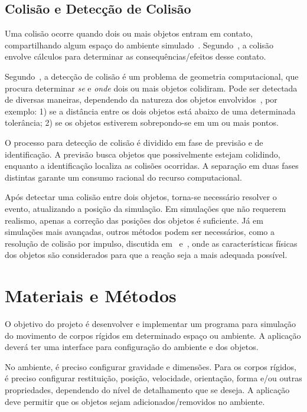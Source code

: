 \documentclass[12pt]{article}
\begin{document}
\subsection{Colisão e Detecção de Colisão}

Uma colisão ocorre quando dois ou mais objetos entram em contato, compartilhando algum espaço do ambiente simulado~\cite{ericson2004real}. Segundo~\cite{bourg2013physics}, a colisão envolve cálculos para determinar as consequências/efeitos desse contato.

Segundo~\cite{bourg2013physics}, a detecção de colisão é um problema de geometria computacional, que procura determinar \emph{se} e \emph{onde} dois ou mais objetos colidiram. Pode ser detectada de diversas maneiras, dependendo da natureza dos objetos envolvidos~\cite{foley1996}, por exemplo: 1) se a distância entre os dois objetos está abaixo de uma determinada tolerância; 2) se os objetos estiverem sobrepondo-se em um ou mais pontos.

O processo para detecção de colisão é dividido em fase de previsão e de identificação. A previsão busca objetos que possivelmente estejam colidindo, enquanto a identificação localiza as colisões ocorridas. A separação em duas fases distintas garante um consumo racional do recurso computacional. 

Após detectar uma colisão entre dois objetos, torna-se necessário resolver o evento, atualizando a posição da simulação. Em simulações que não requerem realismo, apenas a correção das posições dos objetos é suficiente. Já em simulações mais avançadas, outros métodos podem ser necessários, como a resolução de colisão por impulso, discutida em~\cite{bourg2013physics} e~\cite{baraff1992dynamic}, onde as características físicas dos objetos são considerados para que a reação seja a mais adequada possível.

\section{Materiais e Métodos}

O objetivo do projeto é desenvolver e implementar um programa para simulação do movimento de corpos rígidos em determinado espaço ou ambiente. A aplicação deverá ter uma interface para configuração do ambiente e dos objetos.

No ambiente, é preciso configurar gravidade e dimensões. Para os corpos rígidos, é preciso configurar restituição, posição, velocidade, orientação, forma e/ou outras propriedades, dependendo do nível de detalhamento que se deseja. A aplicação deve permitir que os objetos sejam adicionados/removidos no ambiente. 
\end{document}
